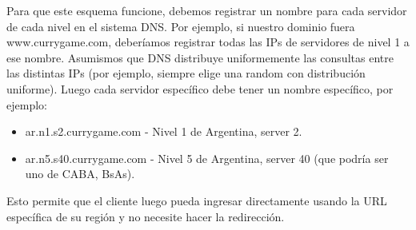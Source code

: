 Para que este esquema funcione, debemos registrar un nombre para cada servidor de cada nivel en
el sistema DNS. Por ejemplo, si nuestro dominio fuera www.currygame.com, deberíamos registrar todas
las IPs de servidores de nivel 1 a ese nombre. Asumismos que DNS distribuye uniformemente
las consultas entre las distintas IPs (por ejemplo, siempre elige una random con distribución uniforme).
Luego cada servidor específico debe tener un nombre específico, por ejemplo:

\begin{itemize}
	\item ar.n1.s2.currygame.com - Nivel 1 de Argentina, server 2.
	\item ar.n5.s40.currygame.com - Nivel 5 de Argentina, server 40 (que podría ser uno de CABA, BsAs).
\end{itemize}

Esto permite que el cliente luego pueda ingresar directamente usando la URL específica de su región
y no necesite hacer la redirección.
